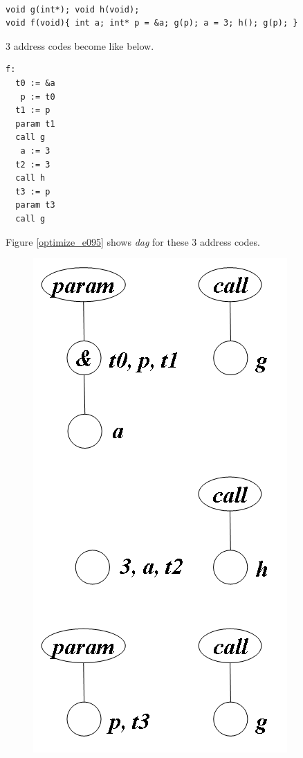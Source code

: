 \begin{Example}
\label{optimize_e094}
\begin{verbatim}

void g(int*); void h(void);
void f(void){ int a; int* p = &a; g(p); a = 3; h(); g(p); }
\end{verbatim}
3 address codes become like below.
\begin{verbatim}
f:
  t0 := &a
   p := t0
  t1 := p
  param t1
  call g
   a := 3
  t2 := 3
  call h
  t3 := p
  param t3
  call g
\end{verbatim}
Figure \ref{optimize_e095} shows {\em dag} for these 3 address codes.
\begin{figure}[htbp]
\begin{center}
\begin{htmlonly}
\includegraphics[width=0.496\linewidth,height=1.0\linewidth]{opt041.png}
\end{htmlonly}
\begin{latexonly}

\end{latexonly}
\end{center}
\end{figure}
\end{Example}
